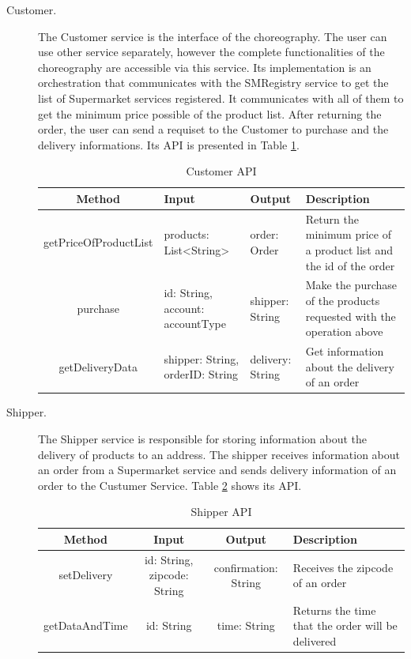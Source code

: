 \begin{description}
\item[Customer.] The Customer service is the interface of the choreography. The user can use other service separately, however the complete functionalities of the choreography are accessible via this service. Its implementation is an orchestration that communicates with the SMRegistry service to get the list of Supermarket services registered. It communicates with all of them to get the minimum price possible of the product list. After returning the order, the user can send a requiset to the Customer to purchase and the delivery informations. Its API is presented in Table \ref{customerapi}.
	\begin{table}[htdp]
	\caption{Customer API}
	\begin{center}
	\begin{tabular}{|c|m{3.5cm}|m{3.5cm}|m{4cm}|}
		\hline
		Method				& Input					& Output 					& Description \\ \hline
		getPriceOfProductList	& products: List<String> & order: Order & Return the minimum price of a product list and the id of the order\\ \hline
		purchase 				& id: String, account: accountType & shipper: String & Make the purchase of the products requested with the operation above \\ \hline
		getDeliveryData 		& shipper: String, orderID: String & delivery: String & Get information about the delivery of an order \\ \hline
		
	\end{tabular}
	\end{center}
	\label{customerapi}
	\end{table}%

\item[Shipper.] The Shipper service is responsible for storing information about the delivery of products to an address. The shipper receives information about an order from a Supermarket service and sends delivery information of an order to the Custumer Service. Table \ref{shipperapi} shows its API.

	\begin{table}[htdp]
	\caption{Shipper API}
	\begin{center}
		\begin{tabular}{|c|c|c|m{4cm}|}
		\hline
		Method			& Input					& Output 					& Description \\ \hline
		setDelivery		& id: String, zipcode: String	& confirmation: String		& Receives the zipcode of an order \\ \hline
		getDataAndTime	& id: String				& time: String				& Returns the time that the order will be delivered \\ \hline
	\end{tabular}
	\end{center}
	\label{shipperapi}
	\end{table}%
	\end{description}
	
